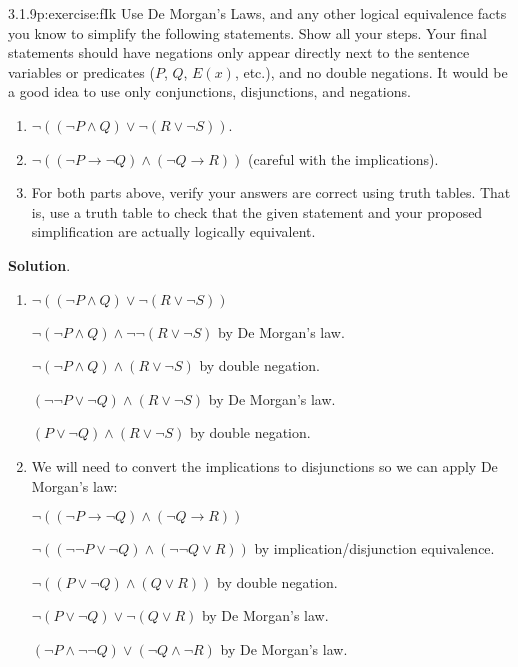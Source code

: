 \documentclass[twoside,11pt,]{book}
\newcommand{\blocktitlefont}{\relax}
\numberwithin{equation}{chapter}
\newcommand{\imp}{\rightarrow}
\begin{document}
\begin{divisionsolution}{3.1.9}{}{p:exercise:fIk}%
Use De Morgan's Laws, and any other logical equivalence facts you know to simplify the following statements. Show all your steps. Your final statements should have negations only appear directly next to the sentence variables or predicates (\(P\), \(Q\), \(E(x)\), etc.), and no double negations. It would be a good idea to use only conjunctions, disjunctions, and negations.%
\begin{enumerate}[label=(\alph*)]
\item{}\(\neg((\neg P \wedge Q) \vee \neg(R \vee \neg S))\).%
\item{}\(\neg((\neg P \imp \neg Q) \wedge (\neg Q \imp R))\) (careful with the implications).%
\item{}For both parts above, verify your answers are correct using truth tables. That is, use a truth table to check that the given statement and your proposed simplification are actually logically equivalent.%
\end{enumerate}
%
\par\smallskip%
\noindent\textbf{\blocktitlefont Solution}.\quad{}%
\begin{enumerate}[label=(\alph*)]
\item{}\(\neg((\neg P \wedge Q) \vee \neg(R \vee \neg S))\)%
\par
\(\neg(\neg P \wedge Q) \wedge \neg\neg(R \vee \neg S)\) by De Morgan's law.%
\par
\(\neg(\neg P \wedge Q) \wedge (R \vee \neg S)\) by double negation.%
\par
\((\neg\neg P \vee \neg Q) \wedge (R \vee \neg S)\) by De Morgan's law.%
\par
\((P \vee \neg Q) \wedge (R \vee \neg S)\) by double negation.%
\item{}We will need to convert the implications to disjunctions so we can apply De Morgan's law:%
\par
\(\neg((\neg P \imp \neg Q) \wedge (\neg Q \imp R))\)%
\par
\(\neg((\neg \neg P \vee \neg Q) \wedge (\neg\neg Q \vee R))\) by implication\slash{}disjunction equivalence.%
\par
\(\neg((P \vee \neg Q) \wedge (Q \vee R))\) by double negation.%
\par
\(\neg(P \vee \neg Q) \vee \neg (Q \vee R)\) by De Morgan's law.%
\par
\((\neg P \wedge \neg \neg Q) \vee (\neg Q \wedge \neg R)\) by De Morgan's law.%
\par

\end{enumerate}
\end{divisionsolution}
\end{document}
